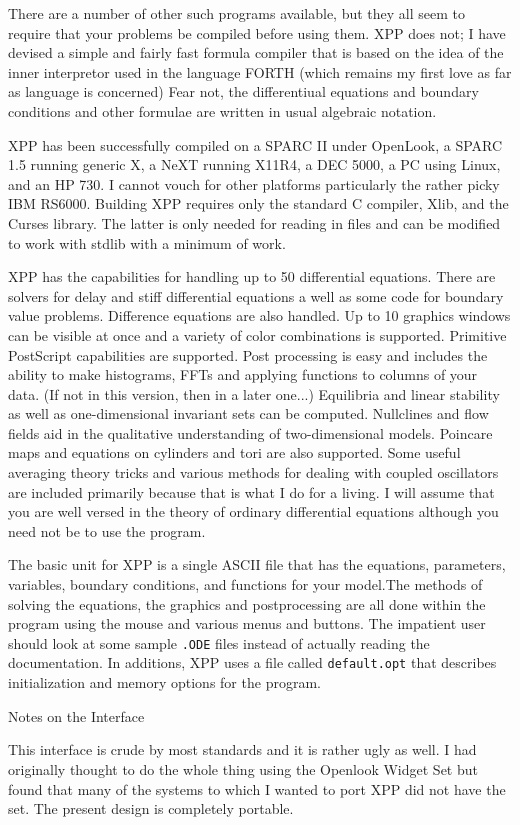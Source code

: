 There are a number of other such programs available, but they all seem to
 require that your problems be compiled before using them.  XPP does not;
 I have devised a simple and fairly fast formula compiler that is based
 on the idea of the inner interpretor used in the language FORTH (which
 remains my first love as far as language is concerned)  Fear not, the
 differentiual equations and boundary conditions and other formulae are
 written in usual algebraic notation. 

XPP has been successfully compiled on a SPARC II under OpenLook, a SPARC
 1.5 running generic X, a NeXT running X11R4, a DEC 5000, a PC using
Linux,
and an HP 730.
  I cannot vouch for other platforms particularly the rather picky 
 IBM RS6000. Building XPP requires only the standard C compiler,
 Xlib, and the Curses library.  The latter is only needed for reading in
 files and can be modified to work with stdlib with a minimum of work.  

XPP has the capabilities for handling up to 50 differential equations. 
 There are solvers for delay and stiff differential equations a well as
 some code for boundary value problems.  Difference equations are also
 handled.  Up to 10 graphics windows can be visible at once and a variety
 of color combinations is supported.  Primitive  PostScript capabilities
 are supported.  Post processing is easy and includes the ability to make
 histograms, FFTs and applying functions to columns of your data.
(If not in this version, then in a later one...)  Equilibria
 and linear stability as well as one-dimensional invariant sets can be
 computed.  Nullclines and flow fields aid in the qualitative understanding
 of two-dimensional models.  Poincare maps and equations on cylinders and
 tori are also supported.  Some useful averaging theory tricks and various
 methods for dealing with coupled oscillators are included primarily because
 that is what I do for a living.
I will assume that you are well versed in the theory of ordinary differential
 equations although you need not be to use the program.  


The basic unit for XPP is a single ASCII file that has the equations, parameters,
 variables, boundary conditions, and functions for your model.The methods
 of solving the equations, the graphics and postprocessing are all done within
 the program using the mouse and various menus and buttons.  The impatient
 user should look at some sample {\tt *.ODE} files instead of actually reading 
the documentation.  In additions, XPP uses a file called {\tt default.opt} that
 describes initialization and memory options for the program.
\begin{center}
{\Large Notes on the Interface }
\end{center}
This interface is crude by most standards and it is rather ugly as
well. I had originally thought to do the whole thing using the
Openlook Widget Set but found that many of the systems to which I
wanted to port XPP did not have the set.  The present design is
completely portable.  

